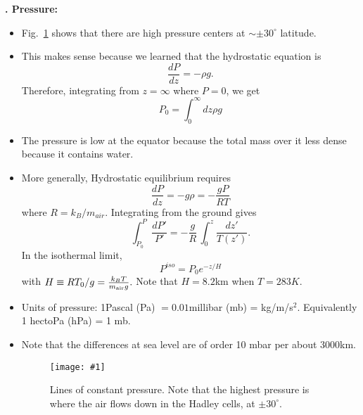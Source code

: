 \documentclass[11pt]{book}
\def\be{\begin{equation}}
\def\ee{\end{equation}}
\newcommand{\sfig}[2]{
\texttt{[image: \#1]}
        }
\newcommand{\Spng}[2]{
   \begin{figure}[thbp]
   \begin{center}
    \sfig{../Figures/#1.png}{0.7\columnwidth}
    \caption{{\small #2}}
    \label{fig:#1}
     \end{center}
   \end{figure}
}
\newcommand{\rf}[1]{\ref{fig:#1}}
\newcommand\bei{\begin{itemize}}
\newcommand\eei{\end{itemize}}
\newcounter{lectureno}
\newcounter{secno}
\newcommand\lsection[1]{
\addtocounter{secno}{1}
{\bf \arabic{lectureno}.\alph{secno} #1:}}
\begin{document}
\lsection{Pressure}
\bei
\item
Fig.~\rf{pressure-sea-level} shows that there are high pressure centers at $\sim\pm30^\circ$ latitude. %
\item This makes sense because we learned that the hydrostatic equation is
\be
\frac{dP}{dz} = -\rho g
.\ee
Therefore, integrating from $z=\infty$ where $P=0$, we get
\be
P_0 = \int_0^\infty dz \rho g
\ee
\item The pressure is low at the equator because the total mass over it less dense because it contains water. 
\item More generally, Hydrostatic equilibrium requires
\be
\frac{dP}{dz} = -g\rho = -\frac{gP}{RT}
\ee
where $R=k_B/m_{air}$. 
%
Integrating from the ground gives
\be
\int_{P_0}^P\frac{dP'}{P'} = -\frac{g}{R}\, \int_0^z \frac{dz'}{T(z')}.\ee
In the isothermal limit,
\be
P^{iso} = P_0 e^{-z/H}\ee
with $H\equiv RT_0/g=\frac{k_BT}{m_{\rm air}g}.$ Note that $H=8.2$km when $T=283K$.
\item Units of pressure: 1Pascal (Pa) $=0.01$millibar (mb) = kg/m/s$^2$. Equivalently 1 hectoPa  (hPa) = 1 mb.
\item Note that the differences at sea level are of order 10 mbar per about 3000km.
\Spng{pressure-sea-level}{Lines of constant pressure. Note that the highest pressure is where the air flows down in the Hadley cells, at $\pm 30^\circ$.}
\eei
\end{document}
